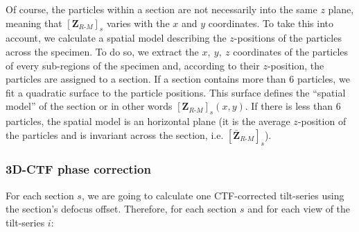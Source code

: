 Of course, the particles within a section are not necessarily into the same $z$ plane, meaning that ${[\bm{Z}_{R\text{-}M}]}_s$ varies with the $x$ and $y$ coordinates. To take this into account, we calculate a spatial model describing the $z$-positions of the particles across the specimen. To do so, we extract the $x,\ y,\ z$ coordinates of the particles of every sub-regions of the specimen and, according to their $z$-position, the particles are assigned to a section. If a section contains more than 6 particles, we fit a quadratic surface to the particle positions. This surface defines the ``spatial model'' of the section or in other words ${[\bm{Z}_{R\text{-}M}]}_s(x,y)$. If there is less than 6 particles, the spatial model is an horizontal plane (it is the average $z$-position of the particles and is invariant across the section, i.e. ${[\bm{\bar{Z}}_{R\text{-}M}]}_s$).


\subsubsection{3D-CTF phase correction} \label{sec:algo:ctf_3d:ctf_phase_correction}

For each section $s$, we are going to calculate one CTF-corrected tilt-series using the section's defocus offset. Therefore, for each section $s$ and for each view of the tilt-series $i$:

